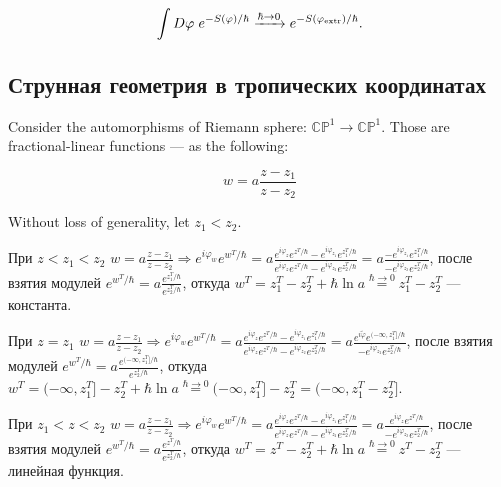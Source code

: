\documentclass[11pt]{article}
\def\R{\Rightarrow}
\def\ph{\varphi}
\theoremstyle{remark}
\theoremstyle{definition}
\begin{document}
$$\int D\ph \hskip 3 pt e^{-S(\ph)/\hbar} \xrightarrow{\hbar \to 0} e^{-S(\ph_{\text{extr}})/\hbar}.$$

\subsection{Струнная геометрия в тропических координатах}

Consider the automorphisms of Riemann sphere: $\mathbb{CP}^1 \to \mathbb{CP}^1$. Those are fractional-linear functions --- as the following:

$$w = a\frac{z-z_1}{z-z_2}$$

Without loss of generality, let $z_1 < z_2$.

При $z<z_1<z_2$ $w = a\frac{z-z_1}{z-z_2} \R e^{i\ph_w} e^{w^T/\hbar} = a \frac{e^{i\ph_{z}} e^{z^T/\hbar} - e^{i\ph_{z_1}} e^{z_1^T/\hbar} }{e^{i\ph_{z}} e^{z^T/\hbar} - e^{i\ph_{z_2}} e^{z_2^T/\hbar}} =  a \frac{ - e^{i\ph_{z_1}} e^{z_1^T/\hbar} }{- e^{i\ph_{z_2}} e^{z_2^T/\hbar}}$, после взятия модулей $e^{w^T/\hbar} = a \frac{e^{z_1^T/\hbar} }{ e^{z_2^T/\hbar}}$, откуда $w^T = z_1^T - z_2^T + \hbar \ln a \stackrel{\hbar \to 0}{=} \boxed{z_1^T - z_2^T}$ --- константа.

При $z = z_1$ $w = a\frac{z-z_1}{z-z_2} \R e^{i\ph_w} e^{w^T/\hbar} = a \frac{e^{i\ph_{z}} e^{z^T/\hbar} - e^{i\ph_{z_1}} e^{z_1^T/\hbar} }{e^{i\ph_{z}} e^{z^T/\hbar} - e^{i\ph_{z_2}} e^{z_2^T/\hbar}} =  a \frac{ e^{i\tilde\ph} e^{(-\infty, z_1^T]/\hbar} }{- e^{i\ph_{z_2}} e^{z_2^T/\hbar}}$, после взятия модулей $e^{w^T/\hbar} = a \frac{e^{(-\infty, z_1^T]/\hbar} }{ e^{z_2^T/\hbar}}$, откуда $w^T = (-\infty, z_1^T] - z_2^T + \hbar \ln a \stackrel{\hbar \to 0}{=} (-\infty, z_1^T] - z_2^T = \boxed{(-\infty, z_1^T - z_2^T]}$.


При $z_1<z<z_2$ $w = a\frac{z-z_1}{z-z_2} \R e^{i\ph_w} e^{w^T/\hbar} = a \frac{e^{i\ph_{z}} e^{z^T/\hbar} - e^{i\ph_{z_1}} e^{z_1^T/\hbar} }{e^{i\ph_{z}} e^{z^T/\hbar} - e^{i\ph_{z_2}} e^{z_2^T/\hbar}} =  a \frac{ e^{i\ph_{z}} e^{z^T/\hbar} }{- e^{i\ph_{z_2}} e^{z_2^T/\hbar}}$, после взятия модулей $e^{w^T/\hbar} = a \frac{e^{z^T/\hbar} }{ e^{z_2^T/\hbar}}$, откуда $w^T = z^T - z_2^T + \hbar \ln a \stackrel{\hbar \to 0}{=} \boxed{z^T - z_2^T}$ --- линейная функция.
\end{document}
